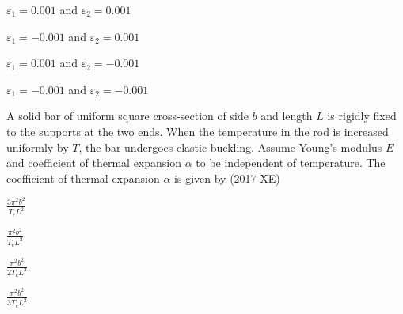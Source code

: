\begin{enumerate}
    \begin{multicols}{2}
        \item $\varepsilon_1 = 0.001$ and $\varepsilon_2 = 0.001$
        \item $\varepsilon_1 = -0.001$ and $\varepsilon_2 = 0.001$
        \item $\varepsilon_1 = 0.001$ and $\varepsilon_2 = -0.001$
        \item  $\varepsilon_1 = -0.001$ and $\varepsilon_2 = -0.001$
    \end{multicols}
\end{enumerate}
\item A solid bar of uniform square cross-section of side $b$ and length $L$ is rigidly fixed to the supports at the two ends. When the temperature in the rod is increased uniformly by $T$, the bar undergoes elastic buckling. Assume Young's modulus $E$ and coefficient of thermal expansion $\alpha$ to be independent of temperature. The coefficient of thermal expansion $\alpha$ is given by \hfill(2017-XE)
\begin{enumerate}
    \begin{multicols}{4}
        \item $\frac{3\pi^2b^2}{T_cL^2}$
         \item $\frac{\pi^2b^2}{T_cL^2}$
          \item $\frac{\pi^2b^2}{2T_cL^2}$
           \item $\frac{\pi^2b^2}{3T_cL^2}$
    \end{multicols}
\end{enumerate}
